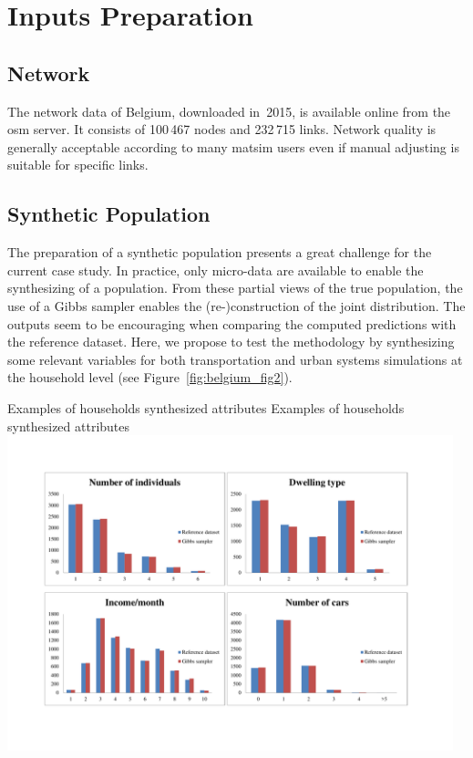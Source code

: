 \section{Inputs Preparation}
\subsection{Network}
The network data of Belgium, downloaded in~2015, is available online from the \gls{osm} server. 
It consists of 100\,467 nodes and 232\,715 links. 
Network quality is generally acceptable according to many \gls{matsim} users even if manual adjusting is suitable for specific links.

\subsection{Synthetic Population}
The preparation of a synthetic population presents a great challenge for the current case study. 
In practice, only micro-data are available to enable the synthesizing of a population. 
From these partial views of the true population, the use of a Gibbs sampler enables the (re-)construction of the joint distribution. 
The outputs seem to be encouraging when comparing the computed predictions with the reference dataset. 
Here, we propose to test the methodology by synthesizing some relevant variables for both transportation and urban systems simulations at the household level (see Figure~\ref{fig:belgium_fig2}).

\createfigure%
{Examples of households synthesized attributes}%
{Examples of households synthesized attributes}%
{\label{fig:belgium_fig2}}%
{\includegraphics[width=0.97\textwidth, angle=0]{scenarios/figures/belgium_fig2.pdf}}%
{}

